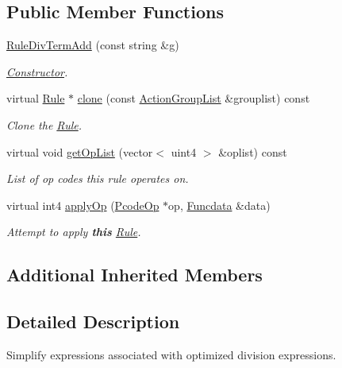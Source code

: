 \subsection*{Public Member Functions}
\begin{DoxyCompactItemize}
\item 
\mbox{\hyperlink{class_rule_div_term_add_aa384aed95bb11b4a2985db1334ed7faa}{Rule\+Div\+Term\+Add}} (const string \&g)
\begin{DoxyCompactList}\small\item\em \mbox{\hyperlink{class_constructor}{Constructor}}. \end{DoxyCompactList}\item 
virtual \mbox{\hyperlink{class_rule}{Rule}} $\ast$ \mbox{\hyperlink{class_rule_div_term_add_a28bccfa9d7315e4e2493302bb18f4691}{clone}} (const \mbox{\hyperlink{class_action_group_list}{Action\+Group\+List}} \&grouplist) const
\begin{DoxyCompactList}\small\item\em Clone the \mbox{\hyperlink{class_rule}{Rule}}. \end{DoxyCompactList}\item 
virtual void \mbox{\hyperlink{class_rule_div_term_add_a151f25f34a814b53139fb9860d70ce9b}{get\+Op\+List}} (vector$<$ uint4 $>$ \&oplist) const
\begin{DoxyCompactList}\small\item\em List of op codes this rule operates on. \end{DoxyCompactList}\item 
virtual int4 \mbox{\hyperlink{class_rule_div_term_add_ad39ae5dc8516af986340cd55e063afcc}{apply\+Op}} (\mbox{\hyperlink{class_pcode_op}{Pcode\+Op}} $\ast$op, \mbox{\hyperlink{class_funcdata}{Funcdata}} \&data)
\begin{DoxyCompactList}\small\item\em Attempt to apply {\bfseries{this}} \mbox{\hyperlink{class_rule}{Rule}}. \end{DoxyCompactList}\end{DoxyCompactItemize}
\subsection*{Additional Inherited Members}


\subsection{Detailed Description}
Simplify expressions associated with optimized division expressions. 

